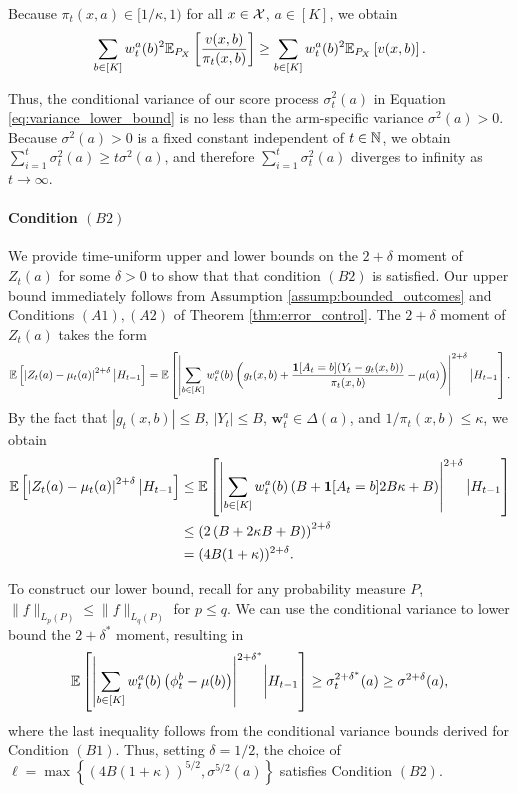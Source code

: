 \documentclass{article}
\begin{document}
\begin{appendices}
Because $\pi_t(x,a) \in [1/\kappa, 1)$ for all $x \in \mathcal{X}$, $a\in [K]$, we obtain 
$$\sum_{b \in [K]}w_t^a(b)^2 \mathbb{E}_{P_X}\left[\frac{v(x,b)}{\pi_t(x,b)}\right] \geq  \sum_{b \in [K]}w_t^a(b)^2 \mathbb{E}_{P_X}\left[v(x,b)\right].$$ 

Thus, the conditional variance of our score process $\sigma_t^2(a)$ in Equation \eqref{eq:variance_lower_bound} is no less than the arm-specific variance $\sigma^2(a) > 0$.  Because $\sigma^2(a) > 0$ is a fixed constant independent of $t \in \mathbb{N}$, we obtain $\sum_{i=1}^t \sigma^2_t(a) \geq t \sigma^2(a)$, and therefore $\sum_{i=1}^t \sigma^2_t(a)$ diverges to infinity as $t \rightarrow \infty$. 



\paragraph{Condition $(B2)$}

We provide time-uniform upper and lower bounds on the $2+\delta$ moment of $Z_t(a)$ for some $\delta > 0$ to show that that condition $(B2)$ is satisfied. Our upper bound immediately follows from Assumption \ref{assump:bounded_outcomes} and Conditions $(A1), (A2)$ of Theorem \ref{thm:error_control}. The $2+\delta$ moment of  $Z_t(a)$ takes the form 
\begin{equation}
    \mathbb{E}\left[\left|Z_t(a) - \mu_t(a) \right|^{2+\delta}  \big| H_{t-1} \right] = \mathbb{E}\left[ \left|\sum_{b \in [K]} w_t^a(b) \left(g_t(x,b)+\frac{\mathbf{1}[A_t = b] (Y_t - g_t(x,b))}{\pi_t(x,b)} - \mu(a)\right) \right|^{2+\delta} \big| H_{t-1}\right].
\end{equation}
By the fact that $|g_t(x,b)| \leq B$, $|Y_t| \leq B$, $\bm{w}_t^a \in \Delta(a)$, and $1/\pi_t(x,b) \leq \kappa$, we obtain
\begin{align}
    \mathbb{E}\left[\left|Z_t(a) - \mu_t(a) \right|^{2+\delta}  \big| H_{t-1} \right]
    &\leq \mathbb{E}\left[ \left|\sum_{b \in [K]} w_t^a(b) \left(B+\mathbf{1}[A_t = b] 2B\kappa + B\right) \right|^{2+\delta} \big| H_{t-1}\right]\\
    &\leq \left(2\left(B + 2\kappa B + B\right)\right)^{2+\delta} \\
    &= (4B(1+\kappa))^{2+\delta}.
\end{align}

To construct our lower bound, recall for any probability measure $P$, $\| f\|_{L_p(P)} \leq \|f \|_{L_q(P)}$ for $p \leq q$. We can use the conditional variance to lower bound the $2+\delta^*$ moment, resulting in 
\begin{equation}
    \mathbb{E}\left[\left| \sum_{b \in [K]} w_t^a(b)\left(\phi_t^{b} - \mu(b)\right) \right|^{2+\delta^*}  \biggr{|} H_{t-1}\right] \geq \sigma_t^{2+\delta^*}(a) \geq \sigma^{2+\delta}(a),
\end{equation}
where the last inequality follows from the conditional variance bounds derived for Condition $(B1)$. Thus, setting $\delta = 1/2$, the choice of $\ell = \max\left\{ (4B(1+\kappa))^{5/2}, \sigma^{5/2}(a) \right\}$ satisfies Condition $(B2)$.



\end{appendices}
\end{document}
